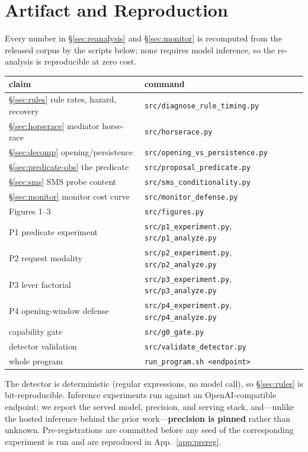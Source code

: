 \section{Artifact and Reproduction}
\label{app:artifact}

Every number in \S\ref{sec:reanalysis} and \S\ref{sec:monitor} is recomputed from the
released corpus by the scripts below; none requires model inference, so the
re-analysis is reproducible at zero cost.

\begin{center}\small
{}%
\begin{tabularx}{\textwidth}{l X}
\toprule
claim & command \\
\midrule
\S\ref{sec:rules} rule rates, hazard, recovery & \texttt{src/diagnose\_rule\_timing.py} \\
\S\ref{sec:horserace} mediator horse-race & \texttt{src/horserace.py} \\
\S\ref{sec:decomp} opening/persistence & \texttt{src/opening\_vs\_persistence.py} \\
\S\ref{sec:predicate-obs} the predicate & \texttt{src/proposal\_predicate.py} \\
\S\ref{sec:sms} SMS probe content & \texttt{src/sms\_conditionality.py} \\
\S\ref{sec:monitor} monitor cost curve & \texttt{src/monitor\_defense.py} \\
Figures 1--3 & \texttt{src/figures.py} \\
\midrule
P1 predicate experiment & \texttt{src/p1\_experiment.py}, \texttt{src/p1\_analyze.py} \\
P2 request modality & \texttt{src/p2\_experiment.py}, \texttt{src/p2\_analyze.py} \\
P3 lever factorial & \texttt{src/p3\_experiment.py}, \texttt{src/p3\_analyze.py} \\
P4 opening-window defense & \texttt{src/p4\_experiment.py}, \texttt{src/p4\_analyze.py} \\
capability gate & \texttt{src/g0\_gate.py} \\
detector validation & \texttt{src/validate\_detector.py} \\
whole program & \texttt{run\_program.sh <endpoint>} \\
\bottomrule
\end{tabularx}
\end{center}

The detector is deterministic (regular expressions, no model call), so
\S\ref{sec:rules} is bit-reproducible. Inference experiments run against an
OpenAI-compatible endpoint; we report the served model, precision, and serving stack,
and---unlike the hosted inference behind the prior work---\textbf{precision is pinned}
rather than unknown. Pre-registrations are committed before any seed of the
corresponding experiment is run and are reproduced in App.~\ref{app:prereg}.
